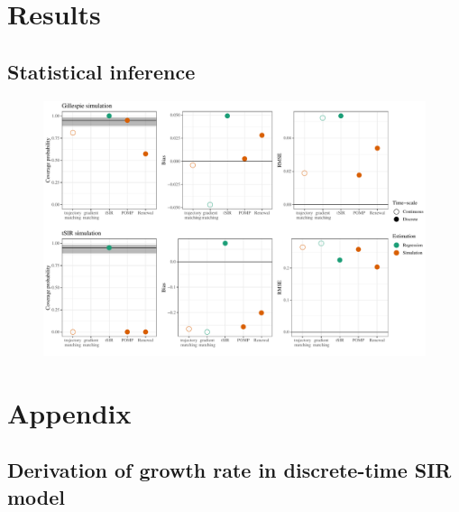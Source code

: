\documentclass{article}
\begin{document}
\section{Results}

\subsection{Statistical inference}

\begin{figure}[t]
\includegraphics[width=\textwidth]{../figure/compare_estimate_sir.pdf}
\end{figure}





\pagebreak

\section{Appendix}

\subsection{Derivation of growth rate in discrete-time SIR model}
\end{document}
